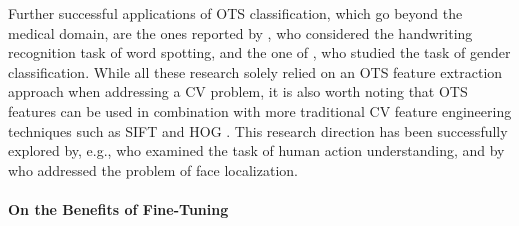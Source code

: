 Further successful applications of OTS classification, which go beyond the medical domain, are the ones reported by \citet{sharma2015adapting}, who considered the handwriting recognition task of word spotting, and the one of \citet{van2015deep}, who studied the task of gender classification. While all these research solely relied on an OTS feature extraction approach when addressing a CV problem, it is also worth noting that OTS features can be used in combination with more traditional CV feature engineering techniques such as SIFT \cite{lowe2004distinctive} and HOG \cite{dalal2005histograms}. This research direction has been successfully explored by, e.g., \citet{wang2014action} who examined the task of human action understanding, and by \citet{zhong2016face} who addressed the problem of face localization.


\paragraph{On the Benefits of Fine-Tuning}
